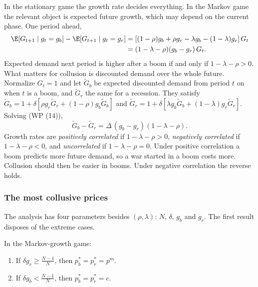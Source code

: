 In the stationary game the growth rate decides everything. In the Markov game the relevant object is expected future
growth, which may depend on the current phase. One period ahead,
\begin{align*}
\E[G_{t+1} \mid g_t = g_b] - \E[G_{t+1} \mid g_t = g_r]
&= \left[(1-\rho)g_b + \rho g_r - \lambda g_b - (1-\lambda)g_r\right]G_t \\
&= (1 - \lambda - \rho)(g_b - g_r)\,G_t .
\end{align*}
Expected demand next period is higher after a boom if and only if $1 - \lambda - \rho > 0$. What matters for collusion is
discounted demand over the whole future. Normalize $G_t = 1$ and let $\tilde G_b$ be expected discounted demand from period
$t$ on when $t$ is a boom, and $\tilde G_r$ the same for a recession. They satisfy
$\tilde G_b = 1 + \delta\left[\rho g_r\tilde G_r + (1-\rho)g_b\tilde G_b\right]$ and
$\tilde G_r = 1 + \delta\left[\lambda g_b\tilde G_b + (1-\lambda)g_r\tilde G_r\right]$. Solving (WP (14)),
\begin{equation}\label{eq:12-bs-14}
\tilde G_b - \tilde G_r = \Delta\,(g_b - g_r)(1 - \lambda - \rho).
\end{equation}
Growth rates are \emph{positively correlated} if $1 - \lambda - \rho > 0$, \emph{negatively correlated} if $1 - \lambda - \rho < 0$,
and \emph{uncorrelated} if $1 - \lambda - \rho = 0$. Under positive correlation a boom predicts more future demand, so a war
started in a boom costs more. Collusion should then be easier in booms. Under negative correlation the reverse holds.

\subsubsection{The most collusive prices}

The analysis has four parameters besides $(\rho, \lambda)$: $N$, $\delta$, $g_b$ and $g_r$. The first result disposes of the
extreme cases.

\begin{proposition}\label{prop:12-bs-extreme}
In the Markov-growth game:
\begin{enumerate}[label=(\roman*)]
\item If $\delta g_r \ge \frac{N-1}{N}$, then $p_b^* = p_r^* = p^m$.
\item If $\delta g_b < \frac{N-1}{N}$, then $p_b^* = p_r^* = c$.
\end{enumerate}
\end{proposition}

